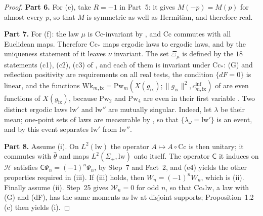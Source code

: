 \documentclass[11pt]{amsart}
\theoremstyle{definition}
\begin{document}
\begin{proof}
\textbf{Part 6.}
For (e), take $R=-1$ in Part~5: it gives $M(-p)=M(p)$ for almost every $p$, so that $M$ is symmetric as well as Hermitian, and therefore real.

\textbf{Part 7.}
For (f): the law $\mu$ is $\mathrm{Cc}$-invariant by \cite[Theorem~44\,(P3)]{QEDIII}, and $\mathrm{Cc}$ commutes with all Euclidean maps.
Therefore $\mathrm{Cc}_*$ maps ergodic laws to ergodic laws, and by the uniqueness statement of \cite[(n7)]{QEDIII} it leaves $\nu$ invariant.
The set $\Xi_\mu$ is defined by the $18$ statements (c1), (c2), (c3) of \cite[Theorem~44\,(B5), (D)]{QEDIII}, and each of them is invariant under $\mathrm{Cc}_*$: (G) and reflection positivity are requirements on all real tests, the condition $\{dF=0\}$ is linear, and the functions $\mathrm{Wk}_{m,\mathrm{ix}}=\allowbreak \mathrm{Pw}_m(X(g_{\mathrm{ix}});\|g_{\mathrm{ix}}\|^2,\allowbreak c^{\mathrm{inf}}_{m,\mathrm{ix}})$ of \cite[Theorem~44\,(B4)]{QEDIII} are even functions of $X(g_{\mathrm{ix}})$, because $\mathrm{Pw}_2$ and $\mathrm{Pw}_4$ are even in their first variable \cite[Section~I.7.6]{QEDIII}.
Two distinct ergodic laws $\mathrm{lw}'$ and $\mathrm{lw}''$ are mutually singular.
Indeed, let $\lambda$ be their mean; one-point sets of laws are measurable by \cite[Proposition~45.6\,(d0)]{QEDIII}, so that $\{\lambda_\omega=\mathrm{lw}'\}$ is an event, and by \cite[Proposition~45.6\,(a), (a$''$)]{QEDIII} this event separates $\mathrm{lw}'$ from $\mathrm{lw}''$.

\textbf{Part 8.}
Assume (i).
On $L^2(\mathrm{lw})$ the operator $A\mapsto A\circ\mathrm{Cc}$ is then unitary; it commutes with $\hat\theta$ and maps $L^2(\Sigma_+,\mathrm{lw})$ onto itself.
The operator $\mathsf C$ it induces on $\mathcal H$ satisfies $\mathsf C\Psi_n=(-1)^n\Psi_n$, by Step~7 and Fact~2, and (e4) yields the other properties required in (iii).
If (iii) holds, then $W_n=(-1)^nW_n$, which is (ii).
Finally assume (ii).
Step~25 gives $\mathcal W_n=0$ for odd $n$, so that $\mathrm{Cc}_*\mathrm{lw}$, a law with (G) and (dF), has the same moments as $\mathrm{lw}$ at disjoint supports; Proposition~1.2\,(c) then yields (i).
\end{proof}
\end{document}
